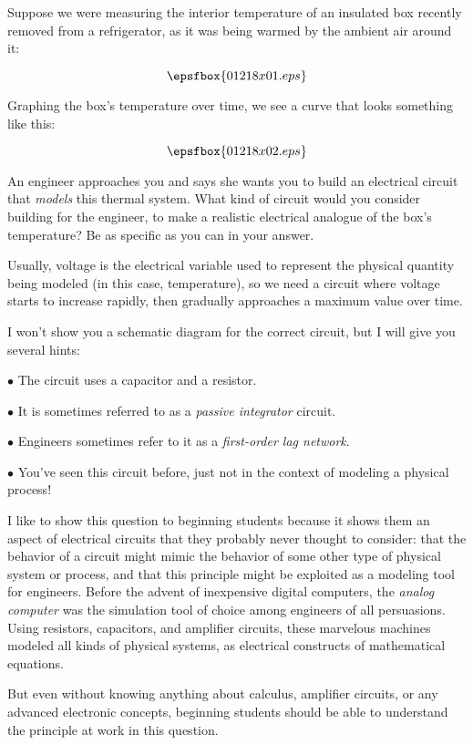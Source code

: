 

Suppose we were measuring the interior temperature of an insulated box recently removed from a refrigerator, as it was being warmed by the ambient air around it:

$$\epsfbox{01218x01.eps}$$

Graphing the box's temperature over time, we see a curve that looks something like this:

$$\epsfbox{01218x02.eps}$$

An engineer approaches you and says she wants you to build an electrical circuit that {\it models} this thermal system.  What kind of circuit would you consider building for the engineer, to make a realistic electrical analogue of the box's temperature?  Be as specific as you can in your answer.







Usually, voltage is the electrical variable used to represent the physical quantity being modeled (in this case, temperature), so we need a circuit where voltage starts to increase rapidly, then gradually approaches a maximum value over time.

I won't show you a schematic diagram for the correct circuit, but I will give you several hints:

\medskip
\item{$\bullet$} The circuit uses a capacitor and a resistor.
\item{$\bullet$} It is sometimes referred to as a {\it passive integrator} circuit.
\item{$\bullet$} Engineers sometimes refer to it as a {\it first-order lag network}.
\item{$\bullet$} You've seen this circuit before, just not in the context of modeling a physical process!
\medskip







I like to show this question to beginning students because it shows them an aspect of electrical circuits that they probably never thought to consider: that the behavior of a circuit might mimic the behavior of some other type of physical system or process, and that this principle might be exploited as a modeling tool for engineers.  Before the advent of inexpensive digital computers, the {\it analog computer} was the simulation tool of choice among engineers of all persuasions.  Using resistors, capacitors, and amplifier circuits, these marvelous machines modeled all kinds of physical systems, as electrical constructs of mathematical equations.

But even without knowing anything about calculus, amplifier circuits, or any advanced electronic concepts, beginning students should be able to understand the principle at work in this question.




